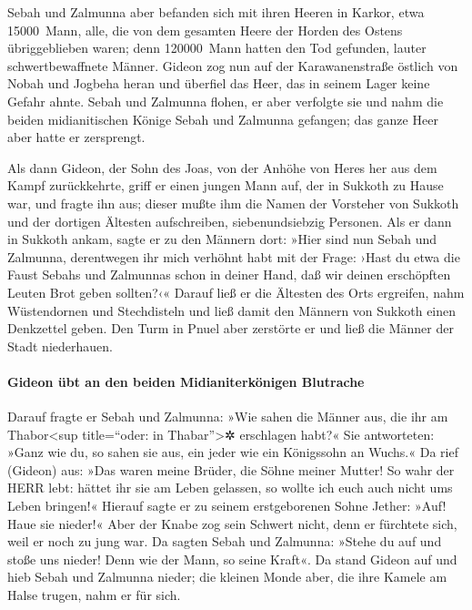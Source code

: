Sebah und Zalmunna aber befanden sich mit ihren Heeren in
Karkor, etwa 15000~Mann, alle, die von dem gesamten Heere der Horden des
Ostens übriggeblieben waren; denn 120000~Mann hatten den Tod gefunden,
lauter schwertbewaffnete Männer. Gideon zog nun auf der
Karawanenstraße östlich von Nobah und Jogbeha heran und überfiel das
Heer, das in seinem Lager keine Gefahr ahnte. Sebah und
Zalmunna flohen, er aber verfolgte sie und nahm die beiden
midianitischen Könige Sebah und Zalmunna gefangen; das ganze Heer aber
hatte er zersprengt.

Als dann Gideon, der Sohn des Joas, von der Anhöhe von
Heres her aus dem Kampf zurückkehrte, griff er einen
jungen Mann auf, der in Sukkoth zu Hause war, und fragte ihn aus; dieser
mußte ihm die Namen der Vorsteher von Sukkoth und der dortigen Ältesten
aufschreiben, siebenundsiebzig Personen. Als er dann in
Sukkoth ankam, sagte er zu den Männern dort: »Hier sind nun Sebah und
Zalmunna, derentwegen ihr mich verhöhnt habt mit der Frage: ›Hast du
etwa die Faust Sebahs und Zalmunnas schon in deiner Hand, daß wir deinen
erschöpften Leuten Brot geben sollten?‹« Darauf ließ er
die Ältesten des Orts ergreifen, nahm Wüstendornen und Stechdisteln und
ließ damit den Männern von Sukkoth einen Denkzettel geben.
Den Turm in Pnuel aber zerstörte er und ließ die Männer
der Stadt niederhauen.

\hypertarget{gideon-uxfcbt-an-den-beiden-midianiterkuxf6nigen-blutrache}{%
\paragraph{Gideon übt an den beiden Midianiterkönigen
Blutrache}\label{gideon-uxfcbt-an-den-beiden-midianiterkuxf6nigen-blutrache}}

Darauf fragte er Sebah und Zalmunna: »Wie sahen die
Männer aus, die ihr am Thabor\textless sup title=``oder: in
Thabar''\textgreater✲ erschlagen habt?« Sie antworteten: »Ganz wie du,
so sahen sie aus, ein jeder wie ein Königssohn an Wuchs.«
Da rief (Gideon) aus: »Das waren meine Brüder, die Söhne
meiner Mutter! So wahr der HERR lebt: hättet ihr sie am Leben gelassen,
so wollte ich euch auch nicht ums Leben bringen!« Hierauf
sagte er zu seinem erstgeborenen Sohne Jether: »Auf! Haue sie nieder!«
Aber der Knabe zog sein Schwert nicht, denn er fürchtete sich, weil er
noch zu jung war. Da sagten Sebah und Zalmunna: »Stehe du
auf und stoße uns nieder! Denn wie der Mann, so seine Kraft«. Da stand
Gideon auf und hieb Sebah und Zalmunna nieder; die kleinen Monde aber,
die ihre Kamele am Halse trugen, nahm er für sich.

